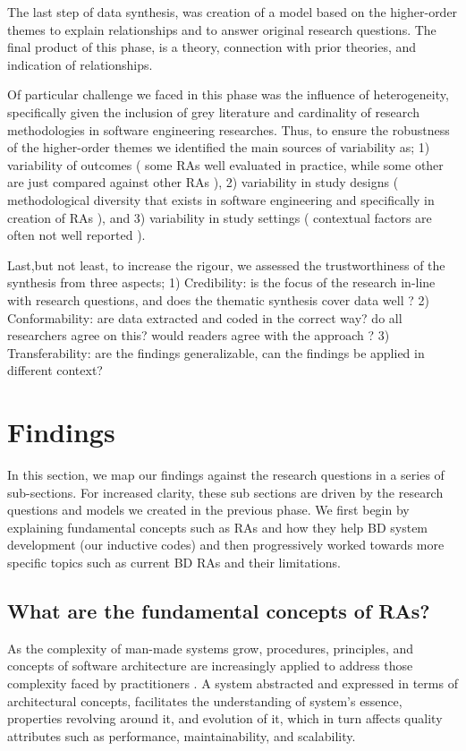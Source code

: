 \documentclass{ieeeaccess}
\begin{document}
The last step of data synthesis, was creation of a model based on the higher-order themes to explain relationships and to answer original research questions. The final product of this phase, is a theory, connection with prior theories, and indication of relationships. 

Of particular challenge we faced in this phase was the influence of heterogeneity, specifically given the inclusion of grey literature and cardinality of research methodologies in software engineering researches. Thus, to ensure the robustness of the higher-order themes we identified the main sources of variability as; 1) variability of outcomes ( some RAs well evaluated in practice, while some other are just compared against other RAs ), 2) variability in study designs ( methodological diversity that exists in software engineering and specifically in creation of RAs ), and 3) variability in study settings ( contextual factors are often not well reported ).

Last,but not least, to increase the rigour, we assessed the trustworthiness of the synthesis from three aspects; 1) Credibility: is the focus of the research in-line with research questions, and does the thematic synthesis cover data well ? 2) Conformability: are data extracted and coded in the correct way? do all researchers agree on this? would readers agree with the approach ? 3) Transferability: are the findings generalizable, can the findings be applied in different context? 

\section{Findings}

In this section, we map our findings against the research questions in a series of sub-sections. For increased clarity, these sub sections are driven by the research questions and models we created in the previous phase. We first begin by explaining fundamental concepts such as RAs and how they help BD system development (our inductive codes) and then progressively worked towards more specific topics such as current BD RAs and their limitations.

\subsection{What are the fundamental concepts of RAs?}

As the complexity of man-made systems grow, procedures, principles, and concepts of software architecture are increasingly applied to address those complexity faced by practitioners \cite{AtaeiACIS}. A system abstracted and expressed in terms of architectural concepts, facilitates the understanding of system’s essence, properties revolving around it, and evolution of it, which in turn affects quality attributes such as performance, maintainability, and scalability. 
\end{document}
